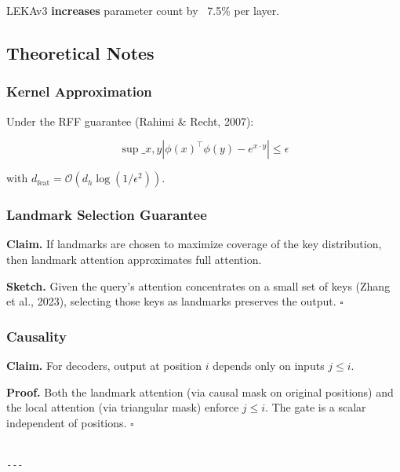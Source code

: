 LEKAv3 \textbf{increases} parameter count by ~7.5\% per layer.

\subsection{Theoretical Notes}

\subsubsection{Kernel Approximation}

Under the RFF guarantee (Rahimi \& Recht, 2007):

\[
\sup\_{x, y} |\phi(x)^\top \phi(y) - e^{x \cdot y}| \leq \epsilon
\tag{4.17}
\]

with $d_\text{feat} = \mathcal{O}(d_h \log(1/\epsilon^2))$.

\subsubsection{Landmark Selection Guarantee}

\textbf{Claim.} If landmarks are chosen to maximize coverage of the key 
distribution, then landmark attention approximates full attention.

\textbf{Sketch.} Given the query's attention concentrates on a small set of 
keys (Zhang et al., 2023), selecting those keys as landmarks preserves 
the output. $\square$

\subsubsection{Causality}

\textbf{Claim.} For decoders, output at position $i$ depends only on inputs 
$j \leq i$.

\textbf{Proof.} Both the landmark attention (via causal mask on original 
positions) and the local attention (via triangular mask) enforce $j \leq i$. 
The gate is a scalar independent of positions. $\square$
\begin{lstlisting}

---
\end{lstlisting}